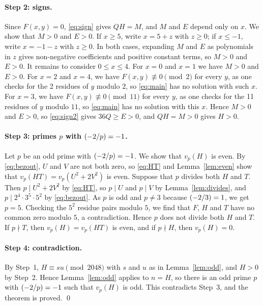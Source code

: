 \documentclass[11pt]{article}
\newcommand{\leg}[2]{\mathchoice{\biggl(\dfrac{#1}{#2}\biggr)}{(#1/#2)}{(#1/#2)}{(#1/#2)}}
\begin{document}
\paragraph{Step 2: signs.} Since $F(x,y)=0$, \eqref{eq:sign} gives $QH=M$, and $M$ and $E$ depend only on $x$. We show that $M>0$ and $E>0$. If $x\geq5$, write $x=5+z$ with $z\geq0$; if $x\leq-1$, write $x=-1-z$ with $z\geq0$. In both cases, expanding $M$ and $E$ as polynomials in $z$ gives non-negative coefficients and positive constant terms, so $M>0$ and $E>0$. It remains to consider $0\leq x\leq4$. For $x=0$ and $x=1$ we have $M>0$ and $E>0$. For $x=2$ and $x=4$, we have $F(x,y)\not\equiv0\pmod{2}$ for every $y$, as one checks for the 2 residues of $y$ modulo $2$, so \eqref{eq:main} has no solution with such $x$. For $x=3$, we have $F(x,y)\not\equiv0\pmod{11}$ for every $y$, as one checks for the 11 residues of $y$ modulo $11$, so \eqref{eq:main} has no solution with this $x$. Hence $M>0$ and $E>0$, so \eqref{eq:sign2} gives $36Q\geq E>0$, and $QH=M>0$ gives $H>0$.

\paragraph{\texorpdfstring{Step 3: primes $p$ with $\leg{-2}{p}=-1$.}{Step 3: inert primes.}} Let $p$ be an odd prime with $\leg{-2}{p}=-1$. We show that $v_p(H)$ is even. By \eqref{eq:bezout}, $U$ and $V$ are not both zero, so \eqref{eq:HT} and Lemma~\ref{lem:even} show that $v_p(HT)=v_p(U^2+2V^2)$ is even. Suppose that $p$ divides both $H$ and $T$. Then $p\mid U^2+2V^2$ by \eqref{eq:HT}, so $p\mid U$ and $p\mid V$ by Lemma~\ref{lem:divides}, and $p\mid 2^{4}\cdot 3^{5}\cdot 5^{2}$ by \eqref{eq:bezout}. As $p$ is odd and $p\neq3$ because $\leg{-2}{3}=1$, we get $p=5$. Checking the $5^2$ residue pairs modulo $5$, we find that $F$, $H$ and $T$ have no common zero modulo $5$, a contradiction. Hence $p$ does not divide both $H$ and $T$. If $p\nmid T$, then $v_p(H)=v_p(HT)$ is even, and if $p\nmid H$, then $v_p(H)=0$.

\paragraph{Step 4: contradiction.} By Step~1, $H\equiv su\pmod{2048}$ with $s$ and $u$ as in Lemma~\ref{lem:odd}, and $H>0$ by Step~2. Hence Lemma~\ref{lem:odd} applies to $n=H$, so there is an odd prime $p$ with $\leg{-2}{p}=-1$ such that $v_p(H)$ is odd. This contradicts Step~3, and the theorem is proved.
\qed
\end{document}
